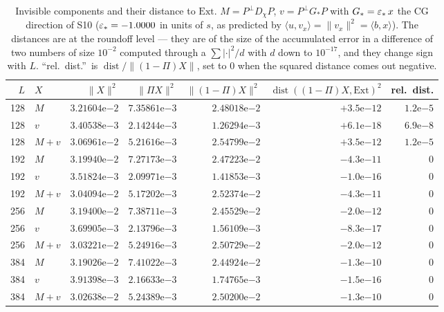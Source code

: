 \documentclass[11pt]{article}
\begin{document}
\begin{table}[htbp]\centering\small
\begin{tabular}{r l rrr r r}
\toprule
$L$&$X$&$\|X\|^2$&$\|\Pi X\|^2$&$\|(1-\Pi)X\|^2$&$\operatorname{dist}((1-\Pi)X,\mathrm{Ext})^2$&rel.\ dist.\\
\midrule
128&$M$          &$3.21604\mathrm{e}{-2}$&$7.35861\mathrm{e}{-3}$&$2.48018\mathrm{e}{-2}$&$+3.5\mathrm{e}{-12}$&$1.2\mathrm{e}{-5}$\\
128&$v$          &$3.40538\mathrm{e}{-3}$&$2.14244\mathrm{e}{-3}$&$1.26294\mathrm{e}{-3}$&$+6.1\mathrm{e}{-18}$&$6.9\mathrm{e}{-8}$\\
128&$M+v$        &$3.06961\mathrm{e}{-2}$&$5.21616\mathrm{e}{-3}$&$2.54799\mathrm{e}{-2}$&$+3.5\mathrm{e}{-12}$&$1.2\mathrm{e}{-5}$\\
192&$M$          &$3.19940\mathrm{e}{-2}$&$7.27173\mathrm{e}{-3}$&$2.47223\mathrm{e}{-2}$&$-4.3\mathrm{e}{-11}$&$0$\\
192&$v$          &$3.51824\mathrm{e}{-3}$&$2.09971\mathrm{e}{-3}$&$1.41853\mathrm{e}{-3}$&$-1.0\mathrm{e}{-16}$&$0$\\
192&$M+v$        &$3.04094\mathrm{e}{-2}$&$5.17202\mathrm{e}{-3}$&$2.52374\mathrm{e}{-2}$&$-4.3\mathrm{e}{-11}$&$0$\\
256&$M$          &$3.19400\mathrm{e}{-2}$&$7.38711\mathrm{e}{-3}$&$2.45529\mathrm{e}{-2}$&$-2.0\mathrm{e}{-12}$&$0$\\
256&$v$          &$3.69905\mathrm{e}{-3}$&$2.13796\mathrm{e}{-3}$&$1.56109\mathrm{e}{-3}$&$-8.3\mathrm{e}{-17}$&$0$\\
256&$M+v$        &$3.03221\mathrm{e}{-2}$&$5.24916\mathrm{e}{-3}$&$2.50729\mathrm{e}{-2}$&$-2.0\mathrm{e}{-12}$&$0$\\
384&$M$          &$3.19026\mathrm{e}{-2}$&$7.41022\mathrm{e}{-3}$&$2.44924\mathrm{e}{-2}$&$-1.3\mathrm{e}{-10}$&$0$\\
384&$v$          &$3.91398\mathrm{e}{-3}$&$2.16633\mathrm{e}{-3}$&$1.74765\mathrm{e}{-3}$&$-1.5\mathrm{e}{-16}$&$0$\\
384&$M+v$        &$3.02638\mathrm{e}{-2}$&$5.24389\mathrm{e}{-3}$&$2.50200\mathrm{e}{-2}$&$-1.3\mathrm{e}{-10}$&$0$\\
\bottomrule
\end{tabular}
\caption{Invisible components and their distance to $\mathrm{Ext}$.  $M=P^\perp D_\chi P$,
$v=P^\perp G_*P$ with $G_*=\varepsilon_*\,x$ the CG direction of S10 ($\varepsilon_*=-1.0000$ in units
of $s$, as predicted by $\langle u,v_x\rangle=\|v_x\|^2=\langle b,x\rangle$).  The
distances are at the roundoff level --- they are of the size of the accumulated error in a
difference of two numbers of size $10^{-2}$ computed through a $\sum|{\cdot}|^2/d$ with
$d$ down to $10^{-17}$, and they change sign with $L$.  ``rel.\ dist.''\ is
$\operatorname{dist}/\|(1-\Pi)X\|$, set to $0$ when the squared distance comes out
negative.}
\label{tab:dist}
\end{table}
\end{document}
